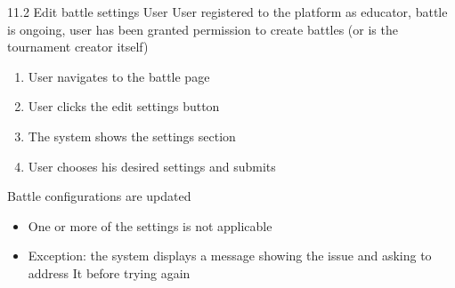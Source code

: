 {11.2}
{Edit battle settings} %
{User} %
{User registered to the platform as educator, battle is ongoing, user has been granted permission to create battles (or is the tournament creator itself)} %
{ %
    \begin{enumerate}
        \item User navigates to the battle page
        \item User clicks the edit settings button
        \item The system shows the settings section
        \item User chooses his desired settings and submits
    \end{enumerate}
}
{Battle configurations are updated} %
{ %
    \begin{itemize}
        \item One or more of the settings is not applicable
    \end{itemize}
}
{ %
    \begin{itemize}
        \item Exception: the system displays a message showing the issue and asking to address It before trying again
    \end{itemize}
}

